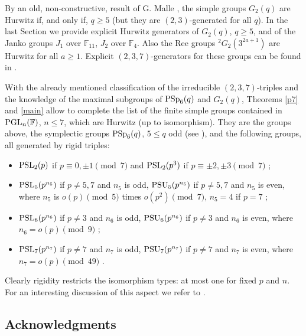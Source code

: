 \documentclass{amsart}
\theoremstyle{remark}
\begin{document}
By an old, non-constructive, result  of G. Malle \cite{Ma}, the simple groups $G_2(q)$ are Hurwitz if, and 
only if, $q\geq 5$ (but they are $(2,3)$-generated for all $q$). 
In the last Section  we provide explicit Hurwitz generators of $G_2(q)$, $q\geq 5$, 
and of the Janko groups $J_1$ over ${\mathbb{F}}_{11}$,  $J_2$ over ${\mathbb{F}}_4$. 
Also the  Ree groups $^2G_2\left(3^{2a+1}\right)$ are Hurwitz for all $a\geq 1$.
Explicit $(2,3,7)$-generators for these groups can be found in \cite{T}.

With the already mentioned classification of the irreducible $(2,3,7)$-triples 
 and the knowledge of the maximal subgroups of 
${\mathop{\rm PSp}\nolimits}_6(q)$ and $G_2(q)$, Theorems  \ref{p7}  and \ref{main} allow to complete the
list of 
the finite simple groups contained in
${\mathop{\rm PGL}\nolimits}_n({\mathbb{F}})$, $n\le 7$, which are Hurwitz  (up to isomorphism).
They are the groups above, the symplectic groups ${\mathop{\rm PSp}\nolimits}_6(q)$, $5\le q$ odd (see \cite{TV}), 
and the following groups, all generated by rigid triples:

\begin{itemize}
\item ${\mathop{\rm PSL}\nolimits}_2(p)$ if $p\equiv 0,\pm 1\pmod 7$ and ${\mathop{\rm PSL}\nolimits}_2(p^{3})$ if $p\equiv \pm 2, \pm 3\pmod 7$
\cite{Mac}; 
\item ${\mathop{\rm PSL}\nolimits}_5(p^{n_5})$ if $p\ne 5,7$  and $n_5$ is odd,  ${\mathop{\rm PSU}\nolimits}_5(p^{n_5})$ if $p\ne 5,7$ 
and $n_5$ is even, where $n_5$ is $o(p)\pmod {5}$ times  $o(p^2)\pmod {7}$, 
$n_5=4$ if $p=7$ \cite{TZ}; 
\item ${\mathop{\rm PSL}\nolimits}_6(p^{n_6})$ if $p\ne 3$ and $n_6$ is odd, ${\mathop{\rm PSU}\nolimits}_6(p^{n_6})$ if $p\ne 3$ and
$n_6$ is even, where $n_6=o(p)\pmod {9}$ \cite{TV1};
\item ${\mathop{\rm PSL}\nolimits}_7(p^{n_7})$ if $p\ne 7$ and $n_7$ is odd, ${\mathop{\rm PSU}\nolimits}_7(p^{n_7})$ if $p\ne 7$ and
$n_7$ is even, where $n_7=o(p)\pmod {49}$ \cite{TV1}. 
\end{itemize}
Clearly rigidity restricts the isomorphism types: at most one for fixed $p$ and $n$.
For an interesting discussion of this aspect we refer to \cite{M} .

\subsection*{Acknowledgments}
\end{document}
